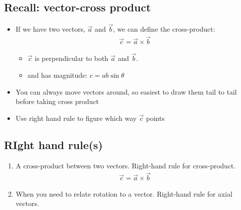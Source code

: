 \documentclass[aspectratio=169,
hyperref={colorlinks,urlcolor=blue}
]{beamer}
\begin{document}
\subsection{Recall: vector-cross product}
{
\begin{itemize}
\item If we have two vectors, $\vec a$ and $\vec b$, we can define the cross-product:
\begin{align*}%
\vec c = \vec a \times \vec b
\end{align*}%
\begin{itemize}
\item $\vec c$ is perpendicular to both $\vec a$ and $\vec b$.
\item  and has magnitude: $c=ab\sin\theta$
\end{itemize}
\item You can always move vectors around, so easiest to draw them tail to tail before taking cross product
\item Use right hand rule to figure which way $\vec c$ points
\end{itemize}
}
{
\centering
{}%
%
}



\subsection{RIght hand rule(s)}
{
\begin{enumerate}
\item A cross-product between two vectors. Right-hand rule for cross-product.
\begin{align*}%
\vec c = \vec a \times \vec b
\end{align*}%
\vspace{1cm}
\item When you need to relate rotation to a vector. Right-hand rule for axial vectors.
\end{enumerate}
}
{
\vspace{-1cm}
\vspace{-0.5cm}
}
\end{document}
